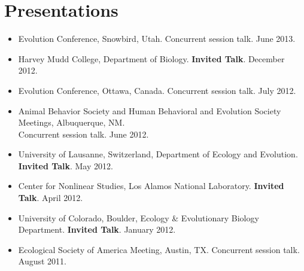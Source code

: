 \documentclass[11pt]{article}
\begin{document}
  { \setlength{\parskip}{1.25ex}
    

}


  \pagestyle{fancy}
  \section{Presentations}

  \begin{itemize}
  \item Evolution Conference, Snowbird, Utah. Concurrent session talk. June 2013.

  \item Harvey Mudd College, Department of Biology.  \textbf{Invited Talk}. December 2012.

  \item Evolution Conference, Ottawa, Canada. Concurrent session talk. July 2012.

  \item Animal Behavior Society and Human Behavioral and Evolution Society Meetings, Albuquerque, NM.  \\
    Concurrent session talk.  June 2012.

  \item %
    University of Lausanne, Switzerland, Department of Ecology and Evolution. \textbf{Invited Talk}. May 2012.

  \item %
    Center for Nonlinear Studies, Los Alamos National Laboratory. \textbf{Invited Talk}. April 2012.

  \item %
    University of Colorado, Boulder, Ecology \& Evolutionary Biology Department. \textbf{Invited Talk}. January 2012.

  \item %
    Ecological Society of America Meeting, Austin, TX. Concurrent session talk. August 2011.


\end{itemize}
\end{document}
